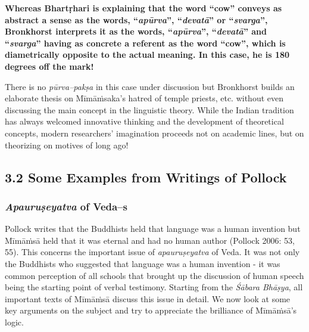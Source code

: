 \textbf{Whereas Bhartṛhari is explaining that the word “cow” conveys as abstract a sense as the words, “\textit{apūrva}”, “\textit{devatā}” or “\textit{svarga}”, Bronkhorst interprets it as the words, “\textit{apūrva}”, “\textit{devatā}” and “\textit{svarga}” having as concrete a referent as the word “cow”, which is diametrically opposite to the actual meaning. In this case, he is 180 degrees off the mark!}

There is no \textit{pūrva--pakṣa} in this case under discussion but Bronkhorst builds an elaborate thesis on Mīmāṁsaka’s hatred of temple priests, etc. without even discussing the main concept in the linguistic theory. While the Indian tradition has always welcomed innovative thinking and the development of theoretical concepts, modern researchers’ imagination proceeds not on academic lines, but on theorizing on motives of long ago!

\vspace{-.3cm}

\subsection*{3.2 Some Examples from Writings of Pollock}

\vspace{-.3cm}

\subsubsection*{\textit{Apauruṣeyatva} of Veda--s}

\vspace{-0.35cm}

Pollock writes that the Buddhists held that language was a human invention but Mīmāṁsā held that it was eternal and had no human author (Pollock 2006: 53, 55). This concerns the important issue of \textit{apauruṣeyatva} of Veda. It was not only the Buddhists who suggested that language was a human invention - it was common perception of all schools that brought up the discussion of human speech being the starting point of verbal testimony. Starting from the \textit{Śābara Bhāṣya}, all important texts of Mīmāṁsā discuss this issue in detail. We now look at some key arguments on the subject and try to appreciate the brilliance of Mīmāṁsā’s logic.


